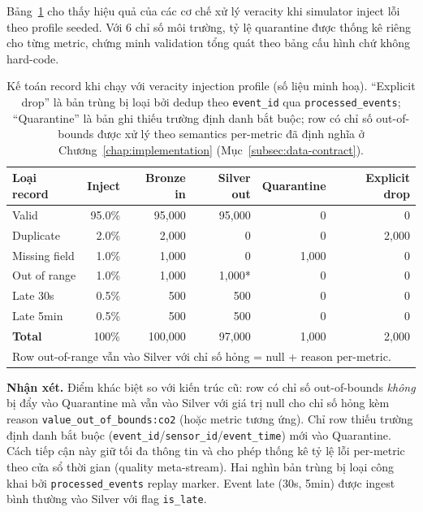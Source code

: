 Bảng~\ref{tab:rq-d} cho thấy hiệu quả của các cơ chế xử lý veracity khi
simulator inject lỗi theo profile seeded. Với 6 chỉ số môi trường, tỷ lệ
quarantine được thống kê riêng cho từng metric, chứng minh validation tổng
quát theo bảng cấu hình chứ không hard-code.

\begin{table}[H]
\centering
\caption[Kế toán record với veracity injection profile (minh hoạ).]{Kế toán record khi chạy với veracity injection profile (số liệu minh hoạ).
``Explicit drop'' là bản trùng bị loại bởi dedup theo \texttt{event\_id}
qua \texttt{processed\_events}; ``Quarantine'' là bản ghi thiếu trường định
danh bắt buộc; row có chỉ số out-of-bounds được xử lý theo semantics
per-metric đã định nghĩa ở Chương~\ref{chap:implementation}
(Mục~\ref{subsec:data-contract}).}
\label{tab:rq-d}
\begin{tabular}{l r rrrr}
\toprule
\textbf{Loại record} & \textbf{Inject} & \textbf{Bronze in} & \textbf{Silver out} & \textbf{Quarantine} & \textbf{Explicit drop} \\
\midrule
Valid          & 95.0\% & 95,000 & 95,000 & 0    & 0 \\
Duplicate      & 2.0\%  & 2,000  & 0      & 0    & 2,000 \\
Missing field  & 1.0\%  & 1,000  & 0      & 1,000 & 0 \\
Out of range   & 1.0\%  & 1,000  & 1,000* & 0    & 0 \\
Late 30s       & 0.5\%  & 500    & 500    & 0    & 0 \\
Late 5min      & 0.5\%  & 500    & 500    & 0    & 0 \\
\midrule
\textbf{Total} & 100\%  & 100,000 & 97,000 & 1,000 & 2,000 \\
\bottomrule
\multicolumn{6}{l}{\footnotesize * Row out-of-range vẫn vào Silver với chỉ số hỏng = null + reason per-metric.}\\
\end{tabular}
\end{table}

\textbf{Nhận xét.} Điểm khác biệt so với kiến trúc cũ: row có chỉ số
out-of-bounds \emph{không} bị đẩy vào Quarantine mà vẫn vào Silver với giá
trị null cho chỉ số hỏng kèm reason \texttt{value\_out\_of\_bounds:co2} (hoặc
metric tương ứng). Chỉ row thiếu trường định danh bắt buộc
(\texttt{event\_id}/\texttt{sensor\_id}/\texttt{event\_time}) mới vào
Quarantine. Cách tiếp cận này giữ tối đa thông tin và cho phép thống kê tỷ
lệ lỗi per-metric theo cửa sổ thời gian (quality meta-stream). Hai nghìn bản
trùng bị loại công khai bởi \texttt{processed\_events} replay marker. Event
late (30s, 5min) được ingest bình thường vào Silver với flag \texttt{is\_late}.


